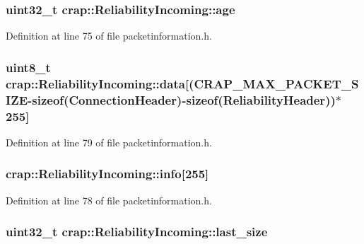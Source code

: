 \subsubsection[{age}]{\setlength{\rightskip}{0pt plus 5cm}uint32\+\_\+t crap\+::\+Reliability\+Incoming\+::age}\label{structcrap_1_1_reliability_incoming_a06a4e1b5acb48747a356c5d0443f298c}


Definition at line 75 of file packetinformation.\+h.

\hypertarget{structcrap_1_1_reliability_incoming_a1f490fd1a8a59c0a9be4e938c4d60ea1}{}
\subsubsection[{data}]{\setlength{\rightskip}{0pt plus 5cm}uint8\+\_\+t crap\+::\+Reliability\+Incoming\+::data\mbox{[}({\bf C\+R\+A\+P\+\_\+\+M\+A\+X\+\_\+\+P\+A\+C\+K\+E\+T\+\_\+\+S\+I\+Z\+E}-\/sizeof({\bf Connection\+Header})-\/sizeof({\bf Reliability\+Header}))$\ast$255\mbox{]}}\label{structcrap_1_1_reliability_incoming_a1f490fd1a8a59c0a9be4e938c4d60ea1}


Definition at line 79 of file packetinformation.\+h.

\hypertarget{structcrap_1_1_reliability_incoming_a563ea21dbd6e8d48af46f8d7c9cae93a}{}
\subsubsection[{info}]{ crap\+::\+Reliability\+Incoming\+::info\mbox{[}255\mbox{]}}\label{structcrap_1_1_reliability_incoming_a563ea21dbd6e8d48af46f8d7c9cae93a}


Definition at line 78 of file packetinformation.\+h.

\hypertarget{structcrap_1_1_reliability_incoming_aa122ede51c3dcfa0916ae170e7e3b241}{}
\subsubsection[{last\+\_\+size}]{\setlength{\rightskip}{0pt plus 5cm}uint32\+\_\+t crap\+::\+Reliability\+Incoming\+::last\+\_\+size}\label{structcrap_1_1_reliability_incoming_aa122ede51c3dcfa0916ae170e7e3b241}


